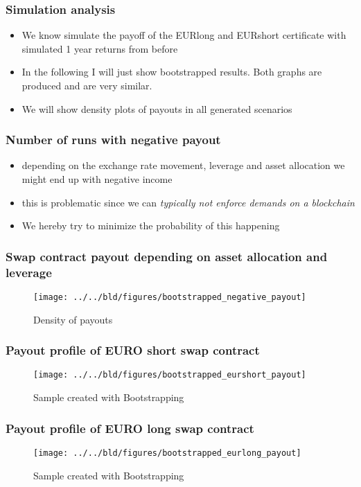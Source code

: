 \documentclass[11pt]{beamer}
\begin{document}
\begin{frame}[t]
    \frametitle{Simulation analysis}
    \begin{itemize}
        \item We know simulate the payoff of the EURlong and EURshort certificate with simulated 1 year returns from before
        \item In the following I will just show bootstrapped results. Both graphs are produced and are very similar.
        \item We will show density plots of payouts in all generated scenarios
    \end{itemize}

    \note{~}
\end{frame}

\begin{frame}[t]
    \frametitle{Number of runs with negative payout}
    \begin{itemize}
        \item depending on the exchange rate movement, leverage and asset allocation we might end up with negative income
        \item this is problematic since we can \it{typically} not enforce demands on a blockchain
        \item We hereby try to minimize the probability of this happening
    \end{itemize}

    \note{~}
\end{frame}


\begin{frame}[t]
    \frametitle{Swap contract payout depending on asset allocation and leverage}
    \begin{figure}
        \caption{Density of payouts}
        \texttt{[image: ../../bld/figures/bootstrapped\_negative\_payout]}
    \end{figure}

\end{frame}


\begin{frame}[t]
    \frametitle{Payout profile of EURO short swap contract}
    \begin{figure}
        \caption{Sample created with Bootstrapping}
        \texttt{[image: ../../bld/figures/bootstrapped\_eurshort\_payout]}
    \end{figure}
\end{frame}


\begin{frame}[t]
    \frametitle{Payout profile of EURO long swap contract}
    \begin{figure}
        \caption{Sample created with Bootstrapping}
        \texttt{[image: ../../bld/figures/bootstrapped\_eurlong\_payout]}
    \end{figure}

\end{frame}
\end{document}
